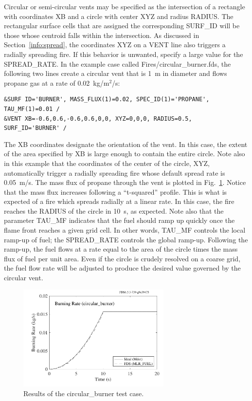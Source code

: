 \documentclass[11pt]{book}
\begin{document}
Circular or semi-circular vents may be specified as the intersection of a rectangle with coordinates {\ct XB} and a circle with center {\ct XYZ} and radius {\ct RADIUS}.  The rectangular surface cells that are assigned the corresponding {\ct SURF\_ID} will be those whose centroid falls within the intersection. As discussed in Section~\ref{info:spread}, the coordinates {\ct XYZ} on a {\ct VENT} line also triggers a radially spreading fire.  If this behavior is unwanted, specify a large value for the {\ct SPREAD\_RATE}. In the example case called {\ct Fires/circular\_burner.fds}, the following two lines create a circular vent that is 1~m in diameter and flows propane gas at a rate of 0.02~kg/m$^2$/s:
\begin{lstlisting}
&SURF ID='BURNER', MASS_FLUX(1)=0.02, SPEC_ID(1)='PROPANE', TAU_MF(1)=0.01 /
&VENT XB=-0.6,0.6,-0.6,0.6,0,0, XYZ=0,0,0, RADIUS=0.5, SURF_ID='BURNER' /
\end{lstlisting}
The {\ct XB} coordinates designate the orientation of the vent. In this case, the extent of the area specified by {\ct XB} is large enough to contain the entire circle. Note also in this example that the coordinates of the center of the circle, {\ct XYZ}, automatically trigger a radially spreading fire whose default spread rate is 0.05~m/s. The mass flux of propane through the vent is plotted in Fig.~\ref{circ_burn}. Notice that the mass flux increases following a ``t-squared'' profile. This is what is expected of a fire which spreads radially at a linear rate. In this case, the fire reaches the {\ct RADIUS} of the circle in 10~s, as expected. Note also that the parameter {\ct TAU\_MF} indicates that the fuel should ramp up quickly once the flame front reaches a given grid cell. In other words, {\ct TAU\_MF} controls the local ramp-up of fuel; the {\ct SPREAD\_RATE} controls the global ramp-up. Following the ramp-up, the fuel flows at a rate equal to the area of the circle times the mass flux of fuel per unit area. Even if the circle is crudely resolved on a coarse grid, the fuel flow rate will be adjusted to produce the desired value governed by the circular vent.
\begin{figure}[h]
\begin{center}
\includegraphics[width=3in]{SCRIPT_FIGURES/circular_burner}
\caption[Results of the {\ct circular\_burner} test case]{Results of the {\ct circular\_burner} test case.}
\label{circ_burn}
\end{center}
\end{figure}
\end{document}
